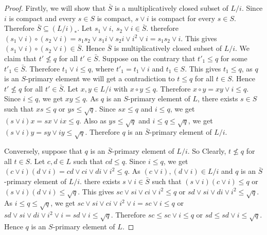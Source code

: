 \documentclass[10pt,twoside,a4paper]{amsart}
\numberwithin{equation}{section}
\theoremstyle{plain}
\theoremstyle{definition}
\begin{document}
\begin{proof}  Firstly, we will show that $\bar{S}$ is a multiplicatively closed subset of $L/i$. Since $i$ is compact and every $s \in S$ is compact, $s \vee i$ is compact for every $s \in S$. Therefore $\bar{S} \subseteq  (L/i)_*$. Let $s_1 \vee i, ~ s_2 \vee i \in \bar{S} $. therefore $(s_1 \vee i) \circ (s_2 \vee i) = s_1 s_2 \vee s_1 i \vee s_2 i \vee i^2 \vee i = s_1 s_2 \vee  i $. This gives $(s_1 \vee i) \circ (s_2 \vee i) \in \bar{S}$. Hence $\bar{S}$ is multiplicatively closed subset of $L/i$. We claim that $t' \nleq q$ for all $t' \in \bar{S}$. Suppose on the contrary that $t'_1 \leq q$ for some $t'_1 \in \bar{S}$. Therefore $t_1 \vee i \leq q$, where $t'_1 = t_1 \vee i$ and $t_1 \in S$. This gives $t_1 \leq q$, as $q$ is an $S$-primary element we will get a contradiction to  $t \leq q$ for all $t \in S$. Hence  $t' \nleq q$ for all $t' \in \bar{S}$.  Let $x, y \in L/i$ with $x \circ y \leq q$. Therefore    $x \circ y  = xy \vee i \leq q$. Since $i \leq q$, we get $xy \leq q$. As $q$ is an $S$-primary element of $L$, there exists $s \in S$ such that $xs \leq q$ or $ys \leq \sqrt{q}$.  Since $sx \leq q$ and $i \leq q$, we get $(s \vee i) x = sx \vee ix \leq q$.  Also as  $ys \leq \sqrt{q}$ and $i \leq q \leq \sqrt{q}$, we get $(s \vee i) y = sy \vee iy \leq \sqrt{q}$.  Therefore $q$ is an $\bar{S}$-primary element of $L/i$.
	
Conversely, suppose that  $q$ is an $\bar{S}$-primary element of $L/i$. So Clearly, $t \nleq q$ for all $t \in S$.  Let $c, d \in L$ such that $ cd \leq q$. Since $i \leq q$, we get $(c \vee i ) (d \vee i) = cd \vee ci \vee di \vee i^2 \leq q$. As $(c \vee i), (d \vee i) \in L/i$ and $q$ is an $\bar{S}$-primary element of $L/i$.  there exists $s \vee i \in \bar{S}$ such that $(s \vee i) (c \vee i) \leq q$ or $(s \vee i) (d \vee i) \leq \sqrt{q}$. This gives $sc \vee si \vee ci \vee i^2 \leq q$ or $sd \vee si \vee di \vee i^2 \leq \sqrt{q}$. As $i \leq q \leq \sqrt{q}$, we get $ sc \vee si \vee ci \vee i^2 \vee i = sc \vee i  \leq q$ or $ sd \vee si \vee di \vee i^2 \vee i  = sd \vee i \leq \sqrt{q} $. Therefore $sc \leq sc \vee i \leq q $ or $sd \leq sd \vee i \leq \sqrt{q}$. Hence $q$ is an $S$-primary element of $L$.
\end{proof}
\end{document}
